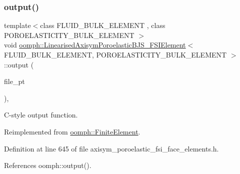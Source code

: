 \subsubsection{\texorpdfstring{output()}{output()}\hspace{0.1cm}{\footnotesize\ttfamily [3/4]}}
{\footnotesize\ttfamily template$<$class F\+L\+U\+I\+D\+\_\+\+B\+U\+L\+K\+\_\+\+E\+L\+E\+M\+E\+NT , class P\+O\+R\+O\+E\+L\+A\+S\+T\+I\+C\+I\+T\+Y\+\_\+\+B\+U\+L\+K\+\_\+\+E\+L\+E\+M\+E\+NT $>$ \\
void \hyperlink{classoomph_1_1LinearisedAxisymPoroelasticBJS__FSIElement}{oomph\+::\+Linearised\+Axisym\+Poroelastic\+B\+J\+S\+\_\+\+F\+S\+I\+Element}$<$ F\+L\+U\+I\+D\+\_\+\+B\+U\+L\+K\+\_\+\+E\+L\+E\+M\+E\+NT, P\+O\+R\+O\+E\+L\+A\+S\+T\+I\+C\+I\+T\+Y\+\_\+\+B\+U\+L\+K\+\_\+\+E\+L\+E\+M\+E\+NT $>$\+::output (\begin{DoxyParamCaption}\item[{F\+I\+LE $\ast$}]{file\+\_\+pt }\end{DoxyParamCaption})\hspace{0.3cm}{\ttfamily [inline]}, {\ttfamily [virtual]}}



C-\/style output function. 



Reimplemented from \hyperlink{classoomph_1_1FiniteElement_a72cddd09f8ddbee1a20a1ff404c6943e}{oomph\+::\+Finite\+Element}.



Definition at line 645 of file axisym\+\_\+poroelastic\+\_\+fsi\+\_\+face\+\_\+elements.\+h.



References oomph\+::output().

\mbox{\label{classoomph_1_1LinearisedAxisymPoroelasticBJS__FSIElement_a9a4a6cf7877a1d7cadff50b800adb848}} 
